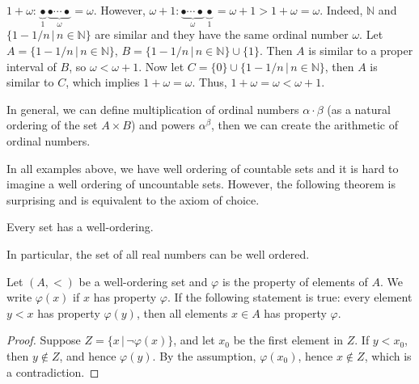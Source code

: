 \begin{example}
$1 + \omega: \underbrace{\bullet}_{1} \underbrace{\bullet \cdots \bullet}_{\omega} = \omega$. However, $\omega + 1: \underbrace{\bullet \cdots \bullet}_{\omega}  \underbrace{\bullet}_{1} = \omega + 1 > 1 + \omega = \omega$. Indeed, $\mathbb{N}$ and $\{1 - 1/n\,|\,n \in \mathbb{N}\}$ are similar and they have the same ordinal number $\omega$. Let $A = \{1 - 1/n\,|\,n \in \mathbb{N}\}$, $B = \{1 - 1/n\,|\,n \in \mathbb{N}\} \cup \{1\}$. Then $A$ is similar to a proper interval of $B$, so $\omega < \omega + 1$. Now let $C = \{0\} \cup \{1 - 1/n\,|\,n \in \mathbb{N}\}$, then $A$ is similar to $C$, which implies $1 + \omega = \omega$. Thus, $1 + \omega = \omega < \omega + 1$.
\end{example}

\medskip

In general, we can define multiplication of ordinal numbers $\alpha \cdot \beta$ (as a natural ordering of the set $A \times B$) and powers $\alpha^\beta$, then we can create the arithmetic of ordinal numbers.

In all examples above, we have well ordering of countable sets and it is hard to imagine a well ordering of uncountable sets. However, the following theorem is surprising and is equivalent to the axiom of choice.

\medskip

\begin{theorem}
Every set has a well-ordering.
\end{theorem}

\medskip

\begin{remark}
In particular, the set of all real numbers can be well ordered.
\end{remark}


\medskip

\begin{theorem}
Let $(A,<)$ be a well-ordering set and $\varphi$ is the property of elements of $A$. We write $\varphi(x)$ if $x$ has property $\varphi$. If the following statement is true: every element $y < x$ has property $\varphi(y)$, then all elements $x \in A$ has property $\varphi$.
\end{theorem}
\begin{proof}
Suppose $Z = \{x \, |\, \neg \varphi(x)\}$, and let $x_0$ be the first element in $Z$. If $y < x_0$, then $y \notin Z$, and hence $\varphi(y)$. By the assumption, $\varphi(x_0)$, hence $x \notin Z$, which is a contradiction.
\end{proof}

\medskip